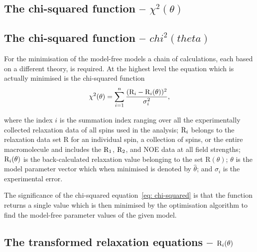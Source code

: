 \begin{latexonly}
    \subsection{The chi-squared function -- $\chi^2(\theta)$}
\end{latexonly}
\begin{htmlonly}
    \subsection{The chi-squared function -- $chi^2(theta)$}
\begin{htmlonly}


For the minimisation of the model-free models a chain of calculations, each based on a different theory, is required.  At the highest level the equation which is actually minimised is the chi-squared function
\begin{equation} \label{eq: chi-squared}
 \chi^2(\theta) = \sum_{i=1}^n \frac{(\mathrm{R}_i - \mathrm{R}_i(\theta))^2}{\sigma_i^2},
\end{equation}

\noindent where the index $i$ is the summation index ranging over all the experimentally collected relaxation data of all spins used in the analysis; $\mathrm{R}_i$ belongs to the relaxation data set R for an individual spin, a collection of spins, or the entire macromolecule and includes the $\mathrm{R}_1$, $\mathrm{R}_2$, and NOE data at all field strengths; $\mathrm{R}_i(\theta)$ is the back-calculated relaxation value belonging to the set R$(\theta)$; $\theta$ is the model parameter vector which when minimised is denoted by $\hat\theta$; and $\sigma_i$ is the experimental error.

The significance of the chi-squared equation~\eqref{eq: chi-squared} is that the function returns a single value which is then minimised by the optimisation algorithm to find the model-free parameter values of the given model.



\begin{latexonly}
    \subsection{The transformed relaxation equations -- $\mathrm{R}_i(\theta)$}
\end{latexonly}
\begin{htmlonly}

\end{htmlonly}
\end{htmlonly}
\end{htmlonly}
